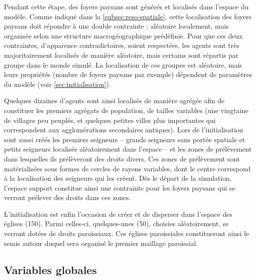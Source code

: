 \begin{tcolorbox}[breakable,left=0pt,right=0pt,top=0pt,bottom=0pt,
	colback=gray!15,colframe=gray!15,width=\dimexpr\textwidth\relax, 
	enlarge left by=0mm, boxsep=5pt,arc=0pt,outer arc=0pt,parbox=false]
Pendant cette étape, des foyers paysans sont générés et localisés dans l'espace du modèle.
Comme indiqué dans la \cref{subsec:reso-spatiale}, cette localisation des foyers paysans doit répondre à une double contrainte : aléatoire localement, mais organisée selon une structure macrogéographique prédéfinie.
Pour que ces deux contraintes, d'apparence contradictoires, soient respectées, les agents sont très majoritairement localisés de manière aléatoire, mais certains sont répartis \og par groupe\fg{} dans le monde simulé.
La localisation de ces groupes est aléatoire, mais leurs propriétés (nombre de foyers paysans par exemple) dépendent de paramètres du modèle (voir \cref{sec:initialisation}).

Quelques dizaines d'agents sont ainsi localisés de manière agrégée afin de constituer les premiers agrégats de population, de tailles variables (une vingtaine de villages peu peuplés, et quelques petites villes plus importantes qui correspondent aux agglomérations secondaires antiques).
Lors de l'initialisation sont aussi créés les premiers seigneurs -- grands seigneurs sans portée spatiale et petits seigneurs localisés aléatoirement dans l'espace -- et les zones de prélèvement dans lesquelles ils prélèveront des droits divers.
Ces zones de prélèvement sont matérialisées sous formes de cercles de rayons variables, dont le centre correspond à la localisation des seigneurs qui les créent.
Dès le départ de la simulation, l'espace support constitue ainsi une contrainte pour les foyers paysans qui se verront prélever des droits dans ces zones.

L'initialisation est enfin l'occasion de créer et de disperser dans l'espace des églises (150).
Parmi celles-ci, quelques-unes (50), choisies aléatoirement, se verront dotées de droits paroissiaux.
Ces églises paroissiales constitueront ainsi le semis autour duquel sera organisé le premier maillage paroissial.
\end{tcolorbox}

\subsection{Variables globales \label{meca-variables}}


